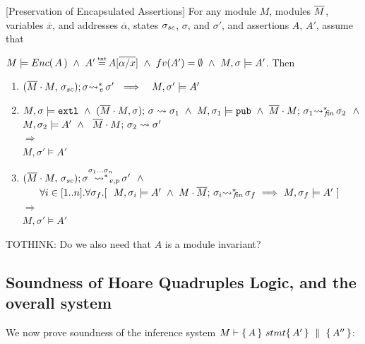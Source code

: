 \begin{auxLemma}
\label{lemma:external_exec_preserves_more}[Preservation of Encapsulated Assertions]
For any module $M$, modules $\overline{M}$, variables $\overline x$, and addresses $\overline \alpha$,
 states $\sigma_{sc}$, $\sigma$, and $\sigma'$, and assertions $A$, $A'$, 
assume that

\noindent
 $M \models \encaps A \   \wedge  \ A'\txteq A[\overline{\alpha/x}]\  \wedge \ fv(A')=\emptyset \  \wedge \ 
M, \sigma \models  A' $. Then

\begin{enumerate}

\item
$   (\overline{M}\cdot M,\, {\sigma_{sc}}); \sigma{\rightsquigarrow^*}\!\!_{e}\, \sigma' 
\ \ \Longrightarrow \ \ \ M, \sigma' \models A'$

\item
$M, \sigma  \models \mbox{\normalfont{\texttt{extl}}} \ \wedge \  (\overline{M}\cdot M, \sigma);\, {\sigma} \rightsquigarrow \sigma_{1} \ \wedge
 \ M, \sigma_1 \models \mbox{\normalfont{\texttt{pub}}} \ \wedge\  \overline{M}\cdot M;\, {\sigma_1} {\rightsquigarrow^*}\!\!_{\mathit{fin}}\, \sigma_2    \ \ \wedge$\\
$ M, \sigma_2 \models A' \ \wedge \ 
  \   \leadstoBounded  {\Mtwo\cdot M} {\sigma_2}      {\sigma'}$\\
 $\Longrightarrow $
\\
$M, \sigma' \models A' $

\item
$ \WithExtPub {\Mtwo\cdot M} {\sigma\bd}  {\sigma}  {\sigma'} {\sigma_1...\sigma_n}\ \ \wedge $\\
 $\strut \ \ \ \  \  \forall i\in [1..n]. \forall \sigma_{f}.[ \ \  M, \sigma_i \models A'  \ \wedge \  \leadstoBoundedStarFin {M\cdot \Mtwo}  {\sigma_i}  {\sigma_{f}} \ 
\Longrightarrow \  M, \sigma_f \models A' \ ]$\\
$\Longrightarrow $
\\
$M, \sigma' \models A' $
\end{enumerate}

TOTHINK: Do we also need that $A$ is a module invariant?
\end{auxLemma}





\subsection{ Soundness of Hoare Quadruples Logic, and the overall system}
\label{sect:prove:sound:quadruples}
We now prove soundness of the inference system $M \vdash   \{\, A \, \}\ stmt \{\, A' \, \} \, \,\parallel\,\, \{\, A'' \, \} $:


